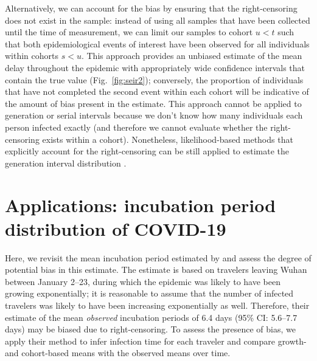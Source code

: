 \documentclass[12pt]{article}
\newcommand{\fref}[1]{Fig.~\ref{fig:#1}}
\newcommand{\comment}[3]{\textcolor{#1}{\textbf{[#2: }\textsl{#3}\textbf{]}}}
\newcommand{\jd}[1]{\comment{cyan}{JD}{#1}}
\begin{document}

Alternatively, we can account for the bias by ensuring that the right-censoring does not exist in the sample:
instead of using all samples that have been collected until the time of measurement, we can limit our samples to cohort $u < t$ such that both epidemiological events of interest have been observed for all individuals within cohorts $s < u$.
This approach provides an unbiased estimate of the mean delay throughout the epidemic with appropriately wide confidence intervals that contain the true value (\fref{seir2});
conversely, the proportion of individuals that have not completed the second event within each cohort will be indicative of the amount of bias present in the estimate.
This approach cannot be applied to generation or serial intervals because we don't know how many individuals each person infected exactly (and therefore we cannot evaluate whether the right-censoring exists within a cohort).
Nonetheless, likelihood-based methods that explicitly account for the right-censoring can be still applied to estimate the generation interval distribution \citep{park2019inferring}.

\section{Applications: incubation period distribution of COVID-19}

Here, we revisit the mean incubation period estimated by \cite{backer2020incubation} and assess the degree of potential bias in this estimate.
The estimate is based on travelers leaving Wuhan between January 2--23, during which the epidemic was likely to have been growing exponentially; it is reasonable to assume that the number of infected travelers was likely to have been increasing exponentially as well.
Therefore, their estimate of the mean \emph{observed} incubation periods of 6.4 days (95\% CI: 5.6–7.7 days) may be biased due to right-censoring.
To assess the presence of bias, we apply their method to infer infection time for each traveler and compare growth- and cohort-based means with the observed means over time.
\end{document}
